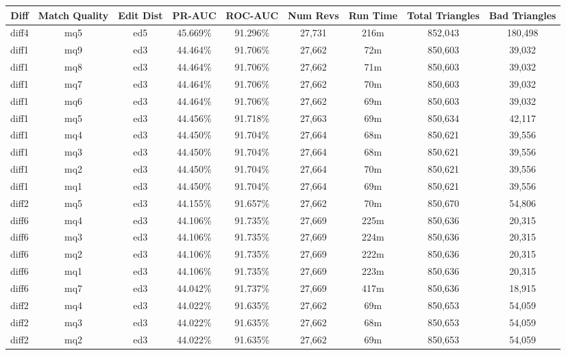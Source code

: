 \begin{sidewaystable}[!ph]
  \begin{center}
    \begin{tabular}{|c|c|c||c|c||c|c|c|c|}
\hline
Diff & Match Quality & Edit Dist
        & PR-AUC & ROC-AUC
        & Num Revs & Run Time
        & Total Triangles & Bad Triangles \\
\hline
\hline
diff4 & mq5 & ed5 & 45.669\% & 91.296\% & 27,731 & 216m & 852,043 & 180,498 \\
diff1 & mq9 & ed3 & 44.464\% & 91.706\% & 27,662 & 72m & 850,603 & 39,032 \\
diff1 & mq8 & ed3 & 44.464\% & 91.706\% & 27,662 & 71m & 850,603 & 39,032 \\
diff1 & mq7 & ed3 & 44.464\% & 91.706\% & 27,662 & 70m & 850,603 & 39,032 \\
diff1 & mq6 & ed3 & 44.464\% & 91.706\% & 27,662 & 69m & 850,603 & 39,032 \\
diff1 & mq5 & ed3 & 44.456\% & 91.718\% & 27,663 & 69m & 850,634 & 42,117 \\
diff1 & mq4 & ed3 & 44.450\% & 91.704\% & 27,664 & 68m & 850,621 & 39,556 \\
diff1 & mq3 & ed3 & 44.450\% & 91.704\% & 27,664 & 68m & 850,621 & 39,556 \\
diff1 & mq2 & ed3 & 44.450\% & 91.704\% & 27,664 & 70m & 850,621 & 39,556 \\
diff1 & mq1 & ed3 & 44.450\% & 91.704\% & 27,664 & 69m & 850,621 & 39,556 \\
diff2 & mq5 & ed3 & 44.155\% & 91.657\% & 27,662 & 70m & 850,670 & 54,806 \\
diff6 & mq4 & ed3 & 44.106\% & 91.735\% & 27,669 & 225m & 850,636 & 20,315 \\
diff6 & mq3 & ed3 & 44.106\% & 91.735\% & 27,669 & 224m & 850,636 & 20,315 \\
diff6 & mq2 & ed3 & 44.106\% & 91.735\% & 27,669 & 222m & 850,636 & 20,315 \\
diff6 & mq1 & ed3 & 44.106\% & 91.735\% & 27,669 & 223m & 850,636 & 20,315 \\
diff6 & mq7 & ed3 & 44.042\% & 91.737\% & 27,669 & 417m & 850,636 & 18,915 \\
diff2 & mq4 & ed3 & 44.022\% & 91.635\% & 27,662 & 69m & 850,653 & 54,059 \\
diff2 & mq3 & ed3 & 44.022\% & 91.635\% & 27,662 & 68m & 850,653 & 54,059 \\
diff2 & mq2 & ed3 & 44.022\% & 91.635\% & 27,662 & 69m & 850,653 & 54,059 \\

\end{tabular}
\end{center}
\end{sidewaystable}
